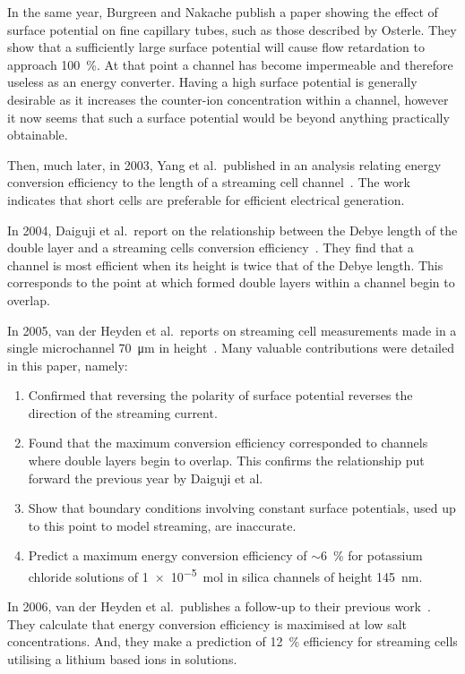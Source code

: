     In the same year, Burgreen and Nakache publish a paper showing the effect of surface potential on fine capillary tubes, such as those described by Osterle\cite{Burgreen1964}.
    They show that a sufficiently large surface potential will cause flow retardation to approach \SI{100}{\percent}.
    At that point a channel has become impermeable and therefore useless as an energy converter.
    Having a high surface potential is generally desirable as it increases the counter-ion concentration within a channel, however it now seems that such a surface potential would be beyond anything practically obtainable.

    Then, much later, in 2003, Yang et al.\ published in an analysis relating energy conversion efficiency to the length of a streaming cell channel~\cite{Yang2003}.
    The work indicates that short cells are preferable for efficient electrical generation.

    In 2004, Daiguji et al.\ report on the relationship between the Debye length of the double layer and a streaming cells conversion efficiency~\cite{Daiguji2004}.
    They find that a channel is most efficient when its height is twice that of the Debye length.
    This corresponds to the point at which formed double layers within a channel begin to overlap.

    In 2005, van der Heyden et al.\ reports on streaming cell measurements made in a single microchannel \SI{70}{\micro\meter} in height~\cite{VanderHeyden2005}.
    Many valuable contributions were detailed in this paper, namely:
    \begin{enumerate}
      \item Confirmed that reversing the polarity of surface potential reverses the direction of the streaming current.
      \item Found that the maximum conversion efficiency corresponded to channels where double layers begin to overlap. This confirms the relationship put forward the previous year by Daiguji et al.\
      \item Show that boundary conditions involving constant surface potentials, used up to this point to model streaming, are inaccurate.
      \item Predict a maximum energy conversion efficiency of $\sim$\SI{6}{\percent} for potassium chloride solutions of \SI{1e-5}{\mole} in silica channels of height \SI{145}{\nano\meter}.
    \end{enumerate}

    In 2006, van der Heyden et al.\ publishes a follow-up to their previous work~\cite{VanderHeyden2006}.
    They calculate that energy conversion efficiency is maximised at low salt concentrations.
    And, they make a prediction of \SI{12}{\percent} efficiency for streaming cells utilising a lithium based ions in solutions.

